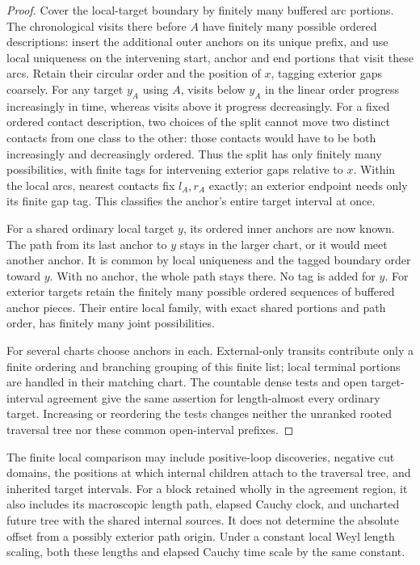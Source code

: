 \begin{proof}
Cover the local-target boundary by finitely many buffered arc portions.  The chronological visits there before $A$ have finitely many possible ordered descriptions: insert the additional outer anchors on its unique prefix, and use local uniqueness on the intervening start, anchor and end portions that visit these arcs.  Retain their circular order and the position of $x$, tagging exterior gaps coarsely.  For any target $y_A$ using $A$, visits below $y_A$ in the linear order progress increasingly in time, whereas visits above it progress decreasingly.  For a fixed ordered contact description, two choices of the split cannot move two distinct contacts from one class to the other: those contacts would have to be both increasingly and decreasingly ordered.  Thus the split has only finitely many possibilities, with finite tags for intervening exterior gaps relative to $x$.  Within the local arcs, nearest contacts fix $l_A,r_A$ exactly; an exterior endpoint needs only its finite gap tag.  This classifies the anchor's entire target interval at once.

For a shared ordinary local target $y$, its ordered inner anchors are now known.  The path from its last anchor to $y$ stays in the larger chart, or it would meet another anchor.  It is common by local uniqueness and the tagged boundary order toward $y$.  With no anchor, the whole path stays there.  No tag is added for $y$.  For exterior targets retain the finitely many possible ordered sequences of buffered anchor pieces.  Their entire local family, with exact shared portions and path order, has finitely many joint possibilities.

For several charts choose anchors in each.  External-only transits contribute only a finite ordering and branching grouping of this finite list; local terminal portions are handled in their matching chart.  The countable dense tests and open target-interval agreement give the same assertion for length-almost every ordinary target.  Increasing or reordering the tests changes neither the unranked rooted traversal tree nor these common open-interval prefixes.
\end{proof}

\begin{corollary}\label{wall:birth-length}
The finite local comparison may include positive-loop discoveries, negative cut domains, the positions at which internal children attach to the traversal tree, and inherited target intervals.  For a block retained wholly in the agreement region, it also includes its macroscopic length path, elapsed Cauchy clock, and uncharted future tree with the shared internal sources.  It does not determine the absolute offset from a possibly exterior path origin.  Under a constant local Weyl length scaling, both these lengths and elapsed Cauchy time scale by the same constant.
\end{corollary}

